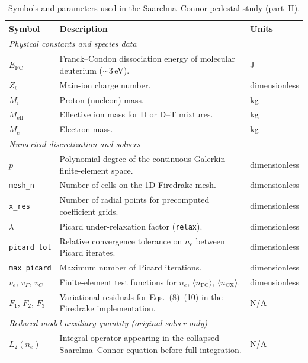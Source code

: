 \documentclass[twocolumn,secnumarabic,amssymb, nobibnotes, aps, prd]{revtex4-2}
\begin{document}
\begin{table}[t]
\caption{\label{tab:variables-cont}Symbols and parameters used in the Saarelma--Connor pedestal study (part~II).}
\begin{ruledtabular}
\begin{tabular}{lll}
Symbol & Description & Units \\
\hline
\multicolumn{3}{l}{\textit{Physical constants and species data}} \\
$E_{\mathrm{FC}}$ & Franck--Condon dissociation energy of molecular deuterium ($\sim 3$\,eV). & J \\
$Z_i$ & Main-ion charge number. & dimensionless \\
$M_i$ & Proton (nucleon) mass. & kg \\
$M_{\mathrm{eff}}$ & Effective ion mass for D or D--T mixtures. & kg \\
$M_e$ & Electron mass. & kg \\
\hline
\multicolumn{3}{l}{\textit{Numerical discretization and solvers}} \\
$p$ & Polynomial degree of the continuous Galerkin finite-element space. & dimensionless \\
\texttt{mesh\_n} & Number of cells on the 1D Firedrake mesh. & dimensionless \\
\texttt{x\_res} & Number of radial points for precomputed coefficient grids. & dimensionless \\
$\lambda$ & Picard under-relaxation factor (\texttt{relax}). & dimensionless \\
\texttt{picard\_tol} & Relative convergence tolerance on $n_e$ between Picard iterates. & dimensionless \\
\texttt{max\_picard} & Maximum number of Picard iterations. & dimensionless \\
$v_e,\,v_F,\,v_C$ & Finite-element test functions for $n_e$, $\langle n_{\mathrm{FC}}\rangle$, $\langle n_{\mathrm{CX}}\rangle$. & dimensionless \\
$F_1,\,F_2,\,F_3$ & Variational residuals for Eqs.~(8)--(10) in the Firedrake implementation. & N/A \\
\hline
\multicolumn{3}{l}{\textit{Reduced-model auxiliary quantity (original solver only)}} \\
$L_2(n_e)$ & Integral operator appearing in the collapsed Saarelma--Connor equation before full integration. & N/A \\
\end{tabular}
\end{ruledtabular}
\end{table}
\end{document}
